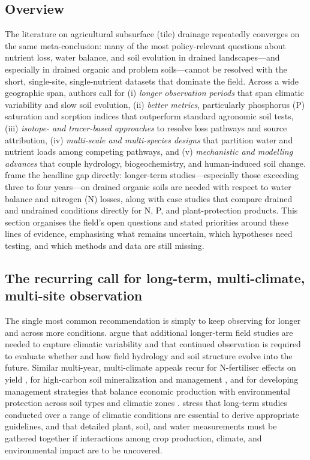 \subsection{Overview}

The literature on agricultural subsurface (tile) drainage repeatedly converges on the same meta-conclusion: many of the most policy-relevant questions about nutrient loss, water balance, and soil evolution in drained landscapes---and especially in drained organic and problem soils---cannot be resolved with the short, single-site, single-nutrient datasets that dominate the field. Across a wide geographic span, authors call for (i) \emph{longer observation periods} that span climatic variability and slow soil evolution, (ii) \emph{better metrics}, particularly phosphorus (P) saturation and sorption indices that outperform standard agronomic soil tests, (iii) \emph{isotope- and tracer-based approaches} to resolve loss pathways and source attribution, (iv) \emph{multi-scale and multi-species designs} that partition water and nutrient loads among competing pathways, and (v) \emph{mechanistic and modelling advances} that couple hydrology, biogeochemistry, and human-induced soil change. \textcite{Gramlich2018} frame the headline gap directly: longer-term studies---especially those exceeding three to four years---on drained organic soils are needed with respect to water balance and nitrogen (N) losses, along with case studies that compare drained and undrained conditions directly for N, P, and plant-protection products. This section organises the field's open questions and stated priorities around these lines of evidence, emphasising what remains uncertain, which hypotheses need testing, and which methods and data are still missing.

\subsection{The recurring call for long-term, multi-climate, multi-site observation}

The single most common recommendation is simply to keep observing for longer and across more conditions. \textcite{Kokulan2019} argue that additional longer-term field studies are needed to capture climatic variability and that continued observation is required to evaluate whether and how field hydrology and soil structure evolve into the future. Similar multi-year, multi-climate appeals recur for N-fertiliser effects on yield \parencite{Kaur2024}, for high-carbon soil mineralization and management \parencite{Waring2022}, and for developing management strategies that balance economic production with environmental protection across soil types and climatic zones \parencite{Kladivko2004}. \textcite{RANDALL1995} stress that long-term studies conducted over a range of climatic conditions are essential to derive appropriate guidelines, and that detailed plant, soil, and water measurements must be gathered together if interactions among crop production, climate, and environmental impact are to be uncovered.


